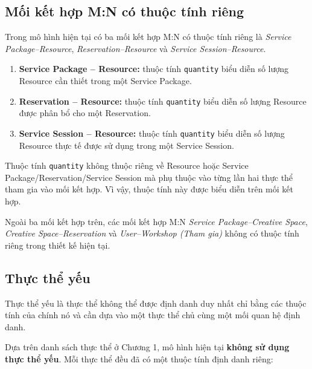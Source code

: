 \subsection{Mối kết hợp M:N có thuộc tính riêng}

Trong mô hình hiện tại có ba mối kết hợp M:N có thuộc tính riêng là \textit{Service Package--Resource}, \textit{Reservation--Resource} và \textit{Service Session--Resource}.

\begin{enumerate}
	\item \textbf{Service Package -- Resource:} thuộc tính \texttt{quantity} biểu diễn số lượng Resource cần thiết trong một Service Package.
	\item \textbf{Reservation -- Resource:} thuộc tính \texttt{quantity} biểu diễn số lượng Resource được phân bổ cho một Reservation.
	\item \textbf{Service Session -- Resource:} thuộc tính \texttt{quantity} biểu diễn số lượng Resource thực tế được sử dụng trong một Service Session.
\end{enumerate}

Thuộc tính \texttt{quantity} không thuộc riêng về Resource hoặc Service Package/Reservation/Service Session mà phụ thuộc vào từng lần hai thực thể tham gia vào mối kết hợp. Vì vậy, thuộc tính này được biểu diễn trên mối kết hợp.

Ngoài ba mối kết hợp trên, các mối kết hợp M:N \textit{Service Package--Creative Space}, \textit{Creative Space--Reservation} và \textit{User--Workshop (Tham gia)} không có thuộc tính riêng trong thiết kế hiện tại.

\subsection{Thực thể yếu}

Thực thể yếu là thực thể không thể được định danh duy nhất chỉ bằng các thuộc tính của chính nó và cần dựa vào một thực thể chủ cùng một mối quan hệ định danh.

Dựa trên danh sách thực thể ở Chương 1, mô hình hiện tại \textbf{không sử dụng thực thể yếu}. Mỗi thực thể đều đã có một thuộc tính định danh riêng:


